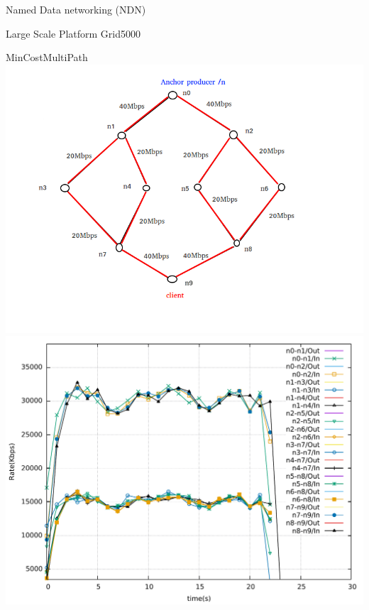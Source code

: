 \documentclass[8pt]{beamer}
\newcommand{\1}{\mathbbm 1}
\begin{document}
\begin{frame}{Named Data networking (NDN)}
\begin{frame}{Large Scale Platform Grid5000}
\begin{frame}{MinCostMultiPath}
{\includegraphics[scale=0.22]{figures/Load.png} 
\includegraphics[scale=0.25]{figures/load.pdf} 
}
\end{frame}
\end{frame}
\end{frame}
\end{document}
